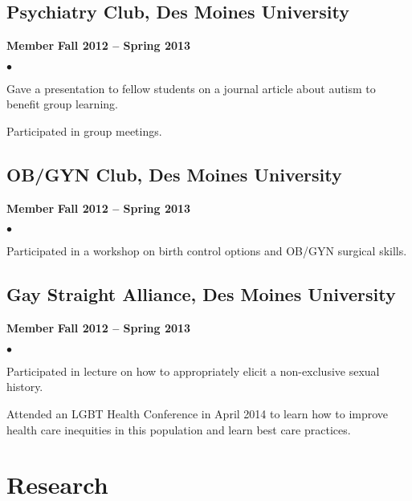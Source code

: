 \documentclass[11pt,letterpaper]{article}
\renewenvironment{itemize}{
  \begin{list}{}{
      \setlength{\leftmargin}{1.5em}
      \setlength{\itemsep}{0.25em}
      \setlength{\parskip}{0pt}
      \setlength{\parsep}{0.25em}
    }
  }{
  \end{list}
}
\newenvironment{bitemize}{
  \begin{list}{$\bullet$}{
      \setlength{\leftmargin}{1.5em}
      \setlength{\itemsep}{0.25em}
      \setlength{\parskip}{0pt}
      \setlength{\parsep}{0.25em}
    }
  }{
  \end{list}
}
\newcommand{\yearrange}[1]{\hfill \textbf{#1} \par}
\begin{document}
\subsection*{Psychiatry Club, Des Moines University}
\begin{itemize}
\item \textbf{Member} \yearrange{Fall 2012 -- Spring 2013}
  \begin{bitemize}
  \item Gave a presentation to fellow students on a journal article about autism to benefit group learning.
  \item Participated in group meetings.
   \end{bitemize}
\end{itemize}

\subsection*{OB/GYN Club, Des Moines University}
\begin{itemize}
\item \textbf{Member} \yearrange{Fall 2012 -- Spring 2013}
  \begin{bitemize}
    \item Participated in a workshop on birth control options and OB/GYN surgical skills. 
  \end{bitemize}
\end{itemize}

\subsection*{Gay Straight Alliance, Des Moines University}
\begin{itemize}
\item \textbf{Member} \yearrange{Fall 2012 -- Spring 2013}
  \begin{bitemize} 
 \item Participated in lecture on how to appropriately elicit a non-exclusive sexual history.
 \item Attended an LGBT Health Conference in April 2014 to learn how to improve health care inequities in this population and learn best care practices.
  \end{bitemize}
\end{itemize}


\section*{Research}
\end{document}
